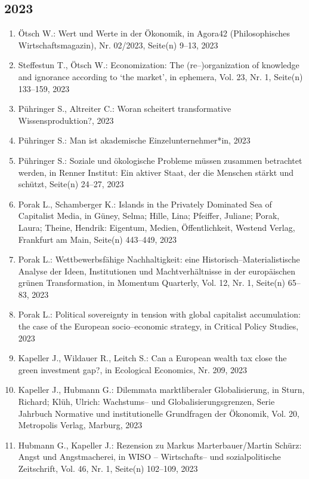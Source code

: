 \subsection*{2023}
\begin{enumerate}
    	 \item Ötsch W.: Wert und Werte in der Ökonomik, in Agora42 (Philosophisches Wirtschaftsmagazin), Nr. 02/2023, Seite(n) 9--13, 2023
	 \item Steffestun T., Ötsch W.: Economization: The (re--)organization of knowledge and ignorance according to ‘the market’, in ephemera, Vol. 23, Nr. 1, Seite(n) 133--159, 2023
	 \item Pühringer S., Altreiter C.: Woran scheitert transformative Wissensproduktion?, 2023
	 \item Pühringer S.: Man ist akademische Einzelunternehmer*in, 2023
	 \item Pühringer S.: Soziale und ökologische Probleme müssen zusammen betrachtet werden, in Renner Institut: Ein aktiver Staat, der die Menschen stärkt und schützt, Seite(n) 24--27, 2023
	 \item Porak L., Schamberger K.: Islands in the Privately Dominated Sea of Capitalist Media, in Güney, Selma; Hille, Lina; Pfeiffer, Juliane; Porak, Laura; Theine, Hendrik: Eigentum, Medien, Öffentlichkeit, Westend Verlag, Frankfurt am Main, Seite(n) 443--449, 2023
	 \item Porak L.: Wettbewerbsfähige Nachhaltigkeit: eine Historisch--Materialistische Analyse der Ideen, Institutionen und Machtverhältnisse in der europäischen grünen Transformation, in Momentum Quarterly, Vol. 12, Nr. 1, Seite(n) 65--83, 2023
	 \item Porak L.: Political sovereignty in tension with global capitalist accumulation: the case of the European socio--economic strategy, in Critical Policy Studies, 2023
	 \item Kapeller J., Wildauer R., Leitch S.: Can a European wealth tax close the green investment gap?, in Ecological Economics, Nr. 209, 2023
	 \item Kapeller J., Hubmann G.: Dilemmata marktliberaler Globalisierung, in Sturn, Richard; Klüh, Ulrich: Wachstums-- und Globalisierungsgrenzen, Serie Jahrbuch Normative und institutionelle Grundfragen der Ökonomik, Vol. 20, Metropolis Verlag, Marburg, 2023
	 \item Hubmann G., Kapeller J.: Rezension zu Markus Marterbauer/Martin Schürz: Angst und Angstmacherei, in WISO -- Wirtschafts-- und sozialpolitische Zeitschrift, Vol. 46, Nr. 1, Seite(n) 102--109, 2023

\end{enumerate}
